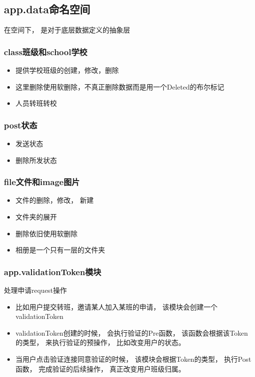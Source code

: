 \subsection{app.data命名空间}

在空间下， 是对于底层数据定义的抽象层

\subsubsection{class班级和school学校}

\begin{itemize}
\item 提供学校班级的创建，修改，删除
\item 这里删除使用软删除，不真正删除数据而是用一个Deleted的布尔标记
\item 人员转班转校
\end{itemize}

\subsubsection{post状态}

\begin{itemize}
\item 发送状态
\item 删除所发状态
\end{itemize}

\subsubsection{file文件和image图片}

\begin{itemize}
\item 文件的删除，修改， 新建
\item 文件夹的展开
\item 删除依旧使用软删除
\item 相册是一个只有一层的文件夹
\end{itemize}



\subsubsection{app.validationToken模块}

处理申请request操作


\begin{itemize}
\item 比如用户提交转班，邀请某人加入某班的申请， 该模块会创建一个validationToken

\item validationToken创建的时候， 会执行验证的Pre函数， 该函数会根据该Token的类型， 来执行验证的预操作， 比如改变用户的状态。

\item 当用户点击验证连接同意验证的时候， 该模块会根据Token的类型， 执行Post函数， 完成验证的后续操作， 真正改变用户班级归属。
\end{itemize}





